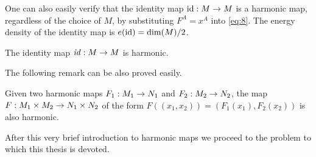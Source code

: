 One can also easily verify that the identity map $\text{id}:M\rightarrow M$ is a
harmonic map, regardless of the choice of $M$, by substituting
$F^A=x^A$ into \eqref{eq:8}. The energy density of the identity map
is $e(\text{id})=\dim(M)/2$.\\

\begin{remark}\label{rem:1}
  The identity map $\text{\emph{id}}:M\rightarrow M$ is harmonic.
\end{remark}

The following remark can be also proved easily.

\begin{remark}\label{rem:2}
  Given two harmonic maps $F_1:M_1\rightarrow N_1$ and $F_2:M_2\rightarrow N_2$, the
  map $F:M_1\times M_2\rightarrow N_1\times N_2$ of the form
  $F((x_1,x_2))=(F_1(x_1),F_2(x_2))$ is also harmonic.
\end{remark}

After this very brief introduction to harmonic maps we proceed to the
problem to which this thesis is devoted.


